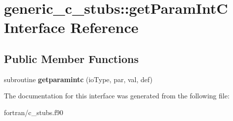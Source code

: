 \hypertarget{interfacegeneric__c__stubs_1_1get_param_int_c}{}\section{generic\+\_\+c\+\_\+stubs\+:\+:get\+Param\+IntC Interface Reference}
\label{interfacegeneric__c__stubs_1_1get_param_int_c}
\subsection*{Public Member Functions}
\begin{DoxyCompactItemize}
\item 
\mbox{\label{interfacegeneric__c__stubs_1_1get_param_int_c_a49450d33201dedfa6b72e1c81783e886}} 
subroutine {\bfseries getparamintc} (io\+Type, par, val, def)
\end{DoxyCompactItemize}


The documentation for this interface was generated from the following file\+:\begin{DoxyCompactItemize}
\item 
fortran/c\+\_\+stubs.\+f90\end{DoxyCompactItemize}
